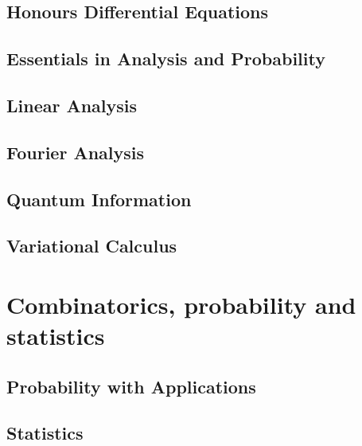 \documentclass[12pt]{report}
\begin{document}
\chapter{Honours Differential Equations}\label{cha:hono-diff-equat}

\chapter{Essentials in Analysis and Probability\label{cha:essent-analys-prob}}

\chapter{Linear Analysis}\label{cha:linear-analysis}

\chapter{Fourier Analysis}\label{cha:fourier-analysis}

\chapter{Quantum Information}\label{cha:quantum-information}

\chapter{Variational Calculus}\label{cha:variational-calculus}


\part{Combinatorics, probability and statistics}

\chapter{Probability with Applications}\label{cha:prob-with-appl}

\chapter{Statistics}\label{cha:statistics}
\end{document}
